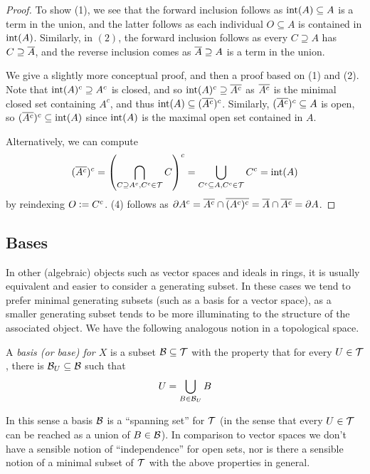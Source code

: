 \documentclass[11pt]{article}
\begin{document}
\begin{proof}
    To show (1), we see that the forward inclusion follows as $\operatorname{int}(A) \subseteq A$ is a term in the union, and the latter follows as each individual $O \subseteq A$ is contained in $\operatorname{int}(A)$. Similarly, in $(2)$, the forward inclusion follows as every $C \supseteq A$ has $C \supseteq \overline{A}$, and the reverse inclusion comes as $\overline{A} \supseteq A$ is a term in the union.

    We give a slightly more conceptual proof, and then a proof based on (1) and (2). Note that $\operatorname{int}(A)^c \supseteq A^c$ is closed, and so $\operatorname{int}(A)^c \supseteq \overline{A^c}$ as $\overline{A^c}$ is the minimal closed set containing $A^c$, and thus $\operatorname{int}(A) \subseteq (\overline{A^c})^c$. Similarly, $(\overline{A^c})^c \subseteq A$ is open, so $(\overline{A^c})^c \subseteq \operatorname{int}(A)$ since $\operatorname{int}(A)$ is the maximal open set contained in $A$.

    Alternatively, we can compute
    $$
        (\overline{A^c})^c = \left(  \bigcap_{C \supseteq A^c, C^c \in \mathcal{T}} C  \right)^c = \bigcup_{C^c \subseteq A, C^c \in \mathcal{T}}C^c = \operatorname{int}(A)
    $$
    by reindexing $O \vcentcolon= C^c$. (4) follows as $\partial A^c = \overline{A^c} \cap \overline{(A^c)^c} = \overline{A} \cap \overline{A^c} = \partial A$.
\end{proof}
\subsection{Bases}
In other (algebraic) objects such as vector spaces and ideals in rings, it is usually equivalent and easier to consider a generating subset. In these cases we tend to prefer minimal generating subsets (such as a basis for a vector space), as a smaller generating subset tends to be more illuminating to the structure of the associated object. We have the following analogous notion in a topological space.
\begin{definition}[Basis]
    A \emph{basis (or base) for $X$} is a subset $\mathcal{B} \subseteq \mathcal{T}$ with the property that for every $U \in \mathcal{T}$, there is $\mathcal{B}_U \subseteq \mathcal{B}$ such that
    $$
        U = \bigcup_{B \in \mathcal{B}_U}B
    $$
\end{definition}
In this sense a basis $\mathcal{B}$ is a ``spanning set'' for $\mathcal{T}$ (in the sense that every $U \in \mathcal{T}$ can be reached as a union of $B \in \mathcal{B}$). In comparison to vector spaces we don't have a sensible notion of ``independence'' for open sets, nor is there a sensible notion of a minimal subset of $\mathcal{T}$ with the above properties in general.
\end{document}
